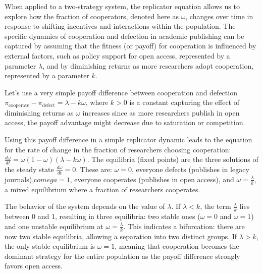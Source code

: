 \documentclass[amsfonts, amssymb, prl, superscriptaddress, notitlepage, twocolumn, nofootinbib]{revtex4-2}
\begin{document}
When applied to a two-strategy system, the replicator equation allows us to explore how the fraction of cooperators, denoted here as $\omega$, changes over time in response to shifting incentives and interactions within the population. The specific dynamics of cooperation and defection in academic publishing can be captured by assuming that the fitness (or payoff) for cooperation is influenced by external factors, such as policy support for open access, represented by a parameter $\lambda$, and by diminishing returns as more researchers adopt cooperation, represented by a parameter $k$. 

Let's use a very simple payoff difference between cooperation and defection $\pi_{\text{cooperate}} - \pi_{\text{defect}} = \lambda - k \omega$,
where $k > 0$ is a constant capturing the effect of diminishing returns as $\omega$ increases since as more researchers publish in open access, the payoff advantage might decrease due to saturation or competition.

Using this payoff difference in a simple replicator dynamic leads to the equation for the rate of change in the fraction of researchers choosing cooperation: $\frac{d\omega}{dt} = \omega (1 - \omega)(\lambda - k \omega)$. The equilibria (fixed points) are the three solutions of the steady state $\frac{d\omega}{dt} = 0$. These are: $\omega = 0$, everyone defects (publishes in legacy journals),c$omega = 1$, everyone cooperates (publishes in open access), and $\omega = \frac{\lambda}{k}$, a mixed equilibrium where a fraction of researchers cooperates.

The behavior of the system depends on the value of $\lambda$. If $\lambda < k$, the term $\frac{\lambda}{k}$ lies between 0 and 1, resulting in three equilibria: two stable ones ($\omega = 0$ and $\omega = 1$) and one unstable equilibrium at $\omega = \frac{\lambda}{k}$. This indicates a bifurcation: there are now two stable equilibria, allowing a separation into two distinct groups. If $\lambda > k$, the only stable equilibrium is $\omega = 1$, meaning that cooperation becomes the dominant strategy for the entire population as the payoff difference strongly favors open access.
\end{document}

